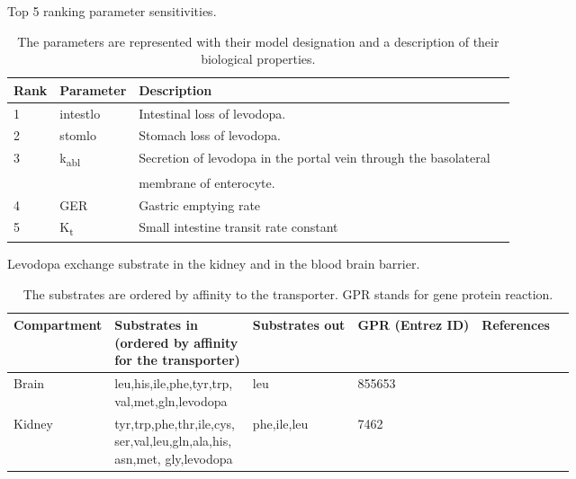 \clearpage
\begin{table}[h]
\caption[Top 5 ranking parameter sensitivities.]{Top 5 ranking parameter sensitivities.}
\begin{center}
	\begin{tabular*}{\textwidth}{l @{\extracolsep{\fill}} lll}
	\hline
	Rank  	           & Parameter & Description       \\ 
	\hline
	1                  & intestlo & Intestinal loss of levodopa.    \\
	2                  & stomlo & Stomach loss of levodopa.  \\
	3                  & k\textsubscript{abl} & Secretion of levodopa in the portal vein through the basolateral\\& & membrane of enterocyte.      \\
	4                  & GER & Gastric emptying rate      \\
	5                  & K\textsubscript{t} & Small intestine transit rate constant  \\
	\hline
	\end{tabular*}
\end{center}
\caption*{The parameters are represented with their model designation and a description of their biological properties.}
\label{tbl:tbls4}%
\end{table}

\clearpage
\begin{table}[h]
\caption[Levodopa exchange substrate in the kidney and in the blood brain barrier.]{Levodopa exchange substrate in the kidney and in the blood brain barrier.}
\begin{center}
	\begin{tabular*}{\textwidth}{l @{\extracolsep{\fill}} lllll}
	\hline
	Compartment  	       & \makecell[l]{Substrates in \\
(ordered by affinity \\for the transporter)}
 & Substrates out & GPR (Entrez ID) & References      \\ 
	\hline
	Brain                  & \makecell[l]{leu,his,ile,phe,tyr,trp,\\
val,met,gln,levodopa}
& leu & 855653 & \cite{verrey2000glycoprotein}   \\
	Kidney                 & \makecell[l]{tyr,trp,phe,thr,ile,cys, \\ ser,val,leu,gln,ala,his,\\ asn,met,
gly,levodopa} & phe,ile,leu & 7462 & \cite{verrey2000glycoprotein} \\
	\hline
	\end{tabular*}
\end{center}
\caption*{The substrates are ordered by affinity to the transporter. GPR stands for gene protein reaction.}
\label{tbl:tbls5}%
\end{table}

